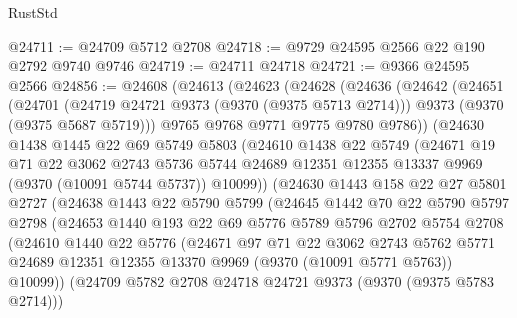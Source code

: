 \begin{lexlean}{RustStd}
\begin{coremodule}
{\begin{coremodule}
{{{{{{{{{{{{{{{{{{{{{{{{{{{{{{{{{{{{{{{@24711 := @24709 @5712 @2708
@24718 := @9729 @24595 @2566 @22 @190 @2792 @9740 @9746
@24719 := @24711 @24718
@24721 := @9366 @24595 @2566
@24856 := @24608
    (@24613
      (@24623
        (@24628
          (@24636
            (@24642
              (@24651
                (@24701
                  (@24719 @24721 @9373 (@9370 (@9375 @5713 @2714)))
                  @9373
                  (@9370 (@9375 @5687 @5719)))
                @9765
                @9768
                @9771
                @9775
                @9780
                @9786))
            (@24630
              @1438
              @1445
              @22
              @69
              @5749
              @5803
              (@24610
                @1438
                @22
                @5749
                (@24671
                  @19
                  @71
                  @22
                  @3062
                  @2743
                  @5736
                  @5744
                  @24689
                  @12351
                  @12355
                  @13337
                  @9969
                  (@9370 (@10091 @5744 @5737))
                  @10099))
              (@24630
                @1443
                @158
                @22
                @27
                @5801
                @2727
                (@24638
                  @1443
                  @22
                  @5790
                  @5799
                  (@24645
                    @1442
                    @70
                    @22
                    @5790
                    @5797
                    @2798
                    (@24653
                      @1440
                      @193
                      @22
                      @69
                      @5776
                      @5789
                      @5796
                      @2702
                      @5754
                      @2708
                      (@24610
                        @1440
                        @22
                        @5776
                        (@24671
                          @97
                          @71
                          @22
                          @3062
                          @2743
                          @5762
                          @5771
                          @24689
                          @12351
                          @12355
                          @13370
                          @9969
                          (@9370 (@10091 @5771 @5763))
                          @10099))
                      (@24709 @5782 @2708 @24718 @24721 @9373 (@9370 (@9375 @5783 @2714)))
}}}}}}}}}}}}}}}}}}}}}}}}}}}}}}}}}}}}}}}
\end{coremodule}}
\end{coremodule}
\end{lexlean}
